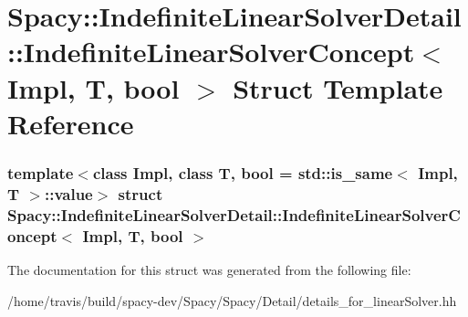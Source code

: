 \hypertarget{structSpacy_1_1IndefiniteLinearSolverDetail_1_1IndefiniteLinearSolverConcept}{\section{\-Spacy\-:\-:\-Indefinite\-Linear\-Solver\-Detail\-:\-:\-Indefinite\-Linear\-Solver\-Concept$<$ \-Impl, \-T, bool $>$ \-Struct \-Template \-Reference}
\label{structSpacy_1_1IndefiniteLinearSolverDetail_1_1IndefiniteLinearSolverConcept}
}
\subsubsection*{template$<$class Impl, class T, bool = std\-::is\-\_\-same$<$ Impl, T $>$\-::value$>$ struct Spacy\-::\-Indefinite\-Linear\-Solver\-Detail\-::\-Indefinite\-Linear\-Solver\-Concept$<$ Impl, T, bool $>$}



\-The documentation for this struct was generated from the following file\-:\begin{DoxyCompactItemize}
\item 
/home/travis/build/spacy-\/dev/\-Spacy/\-Spacy/\-Detail/details\-\_\-for\-\_\-linear\-Solver.\-hh\end{DoxyCompactItemize}

